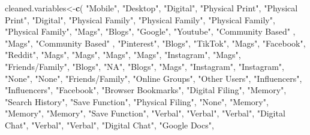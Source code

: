 \documentclass[
]{article}
\newenvironment{Shaded}{\begin{snugshade}}{\end{snugshade}}
\newcommand{\KeywordTok}[1]{\textcolor[rgb]{0.13,0.29,0.53}{\textbf{#1}}}
\newcommand{\NormalTok}[1]{#1}
\newcommand{\StringTok}[1]{\textcolor[rgb]{0.31,0.60,0.02}{#1}}
\begin{document}
\begin{Shaded}
\begin{Highlighting}[]
\NormalTok{cleaned.variables<-}\KeywordTok{c}\NormalTok{(}
  \StringTok{"Mobile"}\NormalTok{,}
  \StringTok{"Desktop"}\NormalTok{,}
  \StringTok{"Digital"}\NormalTok{,}
  \StringTok{"Physical Print"}\NormalTok{,}
  \StringTok{"Physical Print"}\NormalTok{,}
  \StringTok{"Digital"}\NormalTok{,}
  \StringTok{"Physical Family"}\NormalTok{,}
  \StringTok{"Physical Family"}\NormalTok{,}
  \StringTok{"Physical Family"}\NormalTok{,}
  \StringTok{"Physical Family"}\NormalTok{,}
  \StringTok{"Mags"}\NormalTok{,}
  \StringTok{"Blogs"}\NormalTok{,}
  \StringTok{"Google"}\NormalTok{,}
  \StringTok{"Youtube"}\NormalTok{,}
  \StringTok{"Community Based"}\NormalTok{ ,}
  \StringTok{"Mags"}\NormalTok{,}
  \StringTok{"Community Based"}\NormalTok{ ,}
  \StringTok{"Pinterest"}\NormalTok{,}
  \StringTok{"Blogs"}\NormalTok{,}
  \StringTok{"TikTok"}\NormalTok{,}
  \StringTok{"Mags"}\NormalTok{,}
  \StringTok{"Facebook"}\NormalTok{,}
  \StringTok{"Reddit"}\NormalTok{,}
  \StringTok{"Mags"}\NormalTok{,}
  \StringTok{"Mags"}\NormalTok{,}
  \StringTok{"Mags"}\NormalTok{,}
  \StringTok{"Mags"}\NormalTok{,}
  \StringTok{"Instagram"}\NormalTok{,}
  \StringTok{"Mags"}\NormalTok{,}
  \StringTok{"Friends/Family"}\NormalTok{,}
  \StringTok{"Blogs"}\NormalTok{,}
  \StringTok{"NA"}\NormalTok{,}
  \StringTok{"Blogs"}\NormalTok{,}
  \StringTok{"Mags"}\NormalTok{,}
  \StringTok{"Instagram"}\NormalTok{,}
  \StringTok{"Instagram"}\NormalTok{,}
  \StringTok{"None"}\NormalTok{,}
  \StringTok{"None"}\NormalTok{,}
  \StringTok{"Friends/Family"}\NormalTok{,}
  \StringTok{"Online Groups"}\NormalTok{,}
  \StringTok{"Other Users"}\NormalTok{,}
  \StringTok{"Influencers"}\NormalTok{,}
  \StringTok{"Influencers"}\NormalTok{,}
  \StringTok{"Facebook"}\NormalTok{,}
  \StringTok{"Browser Bookmarks"}\NormalTok{,}
  \StringTok{"Digital Filing"}\NormalTok{,}
  \StringTok{"Memory"}\NormalTok{,}
  \StringTok{"Search History"}\NormalTok{,}
  \StringTok{"Save Function"}\NormalTok{,}
  \StringTok{"Physical Filing"}\NormalTok{,}
  \StringTok{"None"}\NormalTok{,}
  \StringTok{"Memory"}\NormalTok{,}
  \StringTok{"Memory"}\NormalTok{,}
  \StringTok{"Memory"}\NormalTok{,}
  \StringTok{"Save Function"}\NormalTok{,}
  \StringTok{"Verbal"}\NormalTok{,}
  \StringTok{"Verbal"}\NormalTok{,}
  \StringTok{"Verbal"}\NormalTok{,}
  \StringTok{"Digital Chat"}\NormalTok{,}
  \StringTok{"Verbal"}\NormalTok{,}
  \StringTok{"Verbal"}\NormalTok{,}
  \StringTok{"Digital Chat"}\NormalTok{,}
  \StringTok{"Google Docs"}\NormalTok{,}

\end{Highlighting}
\end{Shaded}
\end{document}
